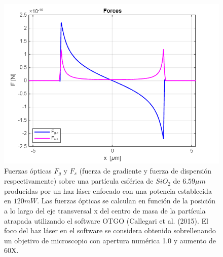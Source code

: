 \documentclass[10pt,aspectratio=1610,compress,dvipsnames]{beamer}
\begin{document}
\begin{frame}
{\begin{figure}
    \centering
    \includegraphics[scale=0.35]{Screenshot 2025-03-05 004832.png}
    \caption{Fuerzas ópticas $F_g$ y $F_s$ (fuerza de gradiente y fuerza de dispersión respectivamente) sobre una partícula esférica de $SiO_2$ de $6.59 \mu m$ producidas por un haz láser enfocado con una potencia establecida en $120 mW$. Las fuerzas ópticas se calculan en función de la posición a lo largo del eje transversal x del centro de masa de la partícula atrapada utilizando el software OTGO (Callegari et al. (2015). El foco del haz láser en el software se considera obtenido sobrellenando un objetivo de microscopio con apertura numérica 1.0 y aumento de 60X.}
    \label{OpticalforcessetupKaren}
\end{figure} 

}





\end{frame}
\end{document}
